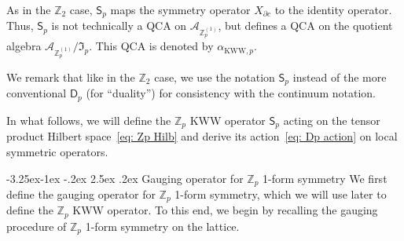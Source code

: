 \documentclass[aps,twocolumn,prx,floatfix,preprintnumbers, nofootinbib,10pt]{revtex4-2}
\makeatletter
\numberwithin{equation}{section}
\theoremstyle{definition}
\theoremstyle{remark}
\theoremstyle{claim}
\newcommand{\aKWWp}{\alpha_{\text{KWW},p}}
\newcommand{\Z}{{\mathbb Z}}
\renewcommand\subsubsection{\@startsection{subsubsection}{3}{\z@}%
                                     {-3.25ex\@plus -1ex \@minus -.2ex}%
                                     {2.5ex \@plus .2ex}%
                                     {\centering\itshape\bfseries\small}}
\renewcommand{\sf}[1]{\mathsf{#1}}
\makeatother
\begin{document}
As in the $\mathbb{Z}_2$ case, $\mathsf{S}_p$ maps the symmetry operator $X_{\partial c}$ to the identity operator.
Thus, $\mathsf{S}_p$ is not technically a QCA on $\mathcal{A}_{\mathbb{Z}_p^{(1)}}$, but defines a QCA on the quotient algebra $\mathcal{A}_{\mathbb{Z}_p^{(1)}} / \mathfrak{I}_p$.
This QCA is denoted by $\aKWWp$.

We remark that like in the $\Z_2$ case, we use the notation $\sf{S}_p$ instead of the more conventional $\sf{D}_p$ (for ``duality'') for consistency with the continuum notation.

In what follows, we will define the $\mathbb{Z}_p$ KWW operator $\mathsf{S}_p$ acting on the tensor product Hilbert space~\eqref{eq: Zp Hilb} and derive its action~\eqref{eq: Dp action} on local symmetric operators.


\subsubsection{Gauging operator for $\mathbb{Z}_p$ 1-form symmetry}
We first define the gauging operator for $\mathbb{Z}_p$ 1-form symmetry, which we will use later to define the $\mathbb{Z}_p$ KWW operator.
To this end, we begin by recalling the gauging procedure of $\mathbb{Z}_p$ 1-form symmetry on the lattice.
\end{document}
